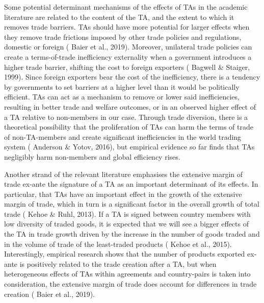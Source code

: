 Some potential determinant mechanisms of the effects of TAs in the
academic literature are related to the content of the TA, and the extent
to which it removes trade barriers. TAs should have more potential for
larger effects when they remove trade frictions imposed by other trade
policies and regulations, domestic or foreign (\cite{baier_widely_2019} Baier et al., 2019).
Moreover, unilateral trade policies can create a terms-of-trade
inefficiency externality when a government introduces a higher trade
barrier, shifting the cost to foreign exporters (\cite{bagwell_economic_1999} Bagwell \& Staiger,
1999). Since foreign exporters bear the cost of the inefficiency, there
is a tendency by governments to set barriers at a higher level than it
would be politically efficient. TAs can act as a mechanism to remove or
lower said inefficiencies, resulting in better trade and welfare
outcomes, or in an observed higher effect of a TA relative to
non-members in our case. Through trade diversion, there is a theoretical
possibility that the proliferation of TAs can harm the terms of trade of
non-TA-members and create significant inefficiencies in the world
trading system (\cite{anderson_terms_2016} Anderson \& Yotov, 2016), but empirical evidence so far
finds that TAs negligibly harm non-members and global efficiency rises.

Another strand of the relevant literature emphasises the extensive
margin of trade ex-ante the signature of a TA as an important
determinant of its effects. In particular, that TAs have an important
effect in the growth of the extensive margin of trade, which in turn is
a significant factor in the overall growth of total trade (\cite{kehoe_how_2013} Kehoe \&
Ruhl, 2013). If a TA is signed between country members with low
diversity of traded goods, it is expected that we will see a bigger
effects of the TA in trade growth driven by the increase in the number
of goods traded and in the volume of trade of the least-traded products
(\cite{kehoe_using_2015} Kehoe et al., 2015). Interestingly, empirical research shows that the
number of products exported ex-ante is positively related to the trade
creation after a TA, but when heterogeneous effects of TAs within
agreements and country-pairs is taken into consideration, the extensive
margin of trade does account for differences in trade creation (\cite{baier_widely_2019} Baier et
al., 2019).

